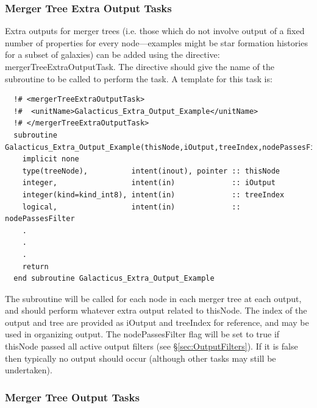\subsubsection{Merger Tree Extra Output Tasks}

Extra outputs for merger trees (i.e. those which do not involve output of a fixed number of properties for every node---examples might be star formation histories for a subset of galaxies) can be added using the directive: {\normalfont \ttfamily mergerTreeExtraOutputTask}. The directive should give the name of the subroutine to be called to perform the task. A template for this task is:
\begin{verbatim}
  !# <mergerTreeExtraOutputTask>
  !#  <unitName>Galacticus_Extra_Output_Example</unitName>
  !# </mergerTreeExtraOutputTask>
  subroutine Galacticus_Extra_Output_Example(thisNode,iOutput,treeIndex,nodePassesFilter)
    implicit none
    type(treeNode),          intent(inout), pointer :: thisNode
    integer,                 intent(in)             :: iOutput
    integer(kind=kind_int8), intent(in)             :: treeIndex
    logical,                 intent(in)             :: nodePassesFilter
    .
    .
    .
    return
  end subroutine Galacticus_Extra_Output_Example
\end{verbatim}
The subroutine will be called for each node in each merger tree at each output, and should perform whatever extra output related to {\normalfont \ttfamily thisNode}. The index of the output and tree are provided as {\normalfont \ttfamily iOutput} and {\normalfont \ttfamily treeIndex} for reference, and may be used in organizing output. The {\normalfont \ttfamily nodePassesFilter} flag will be set to {\normalfont \ttfamily true} if {\normalfont \ttfamily thisNode} passed all active output filters (see \S\ref{sec:OutputFilters}). If it is {\normalfont \ttfamily false} then typically no output should occur (although other tasks may still be undertaken).

\subsubsection{Merger Tree Output Tasks}

